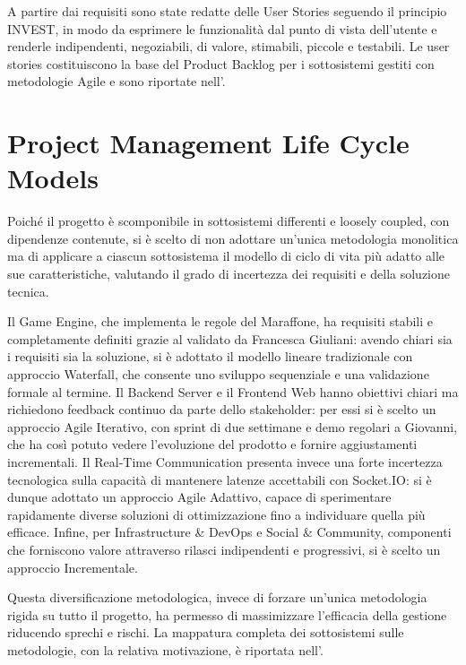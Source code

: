 A partire dai requisiti sono state redatte delle User Stories seguendo il principio INVEST, in modo da esprimere le funzionalità dal punto di vista dell'utente e renderle indipendenti, negoziabili, di valore, stimabili, piccole e testabili. Le user stories costituiscono la base del Product Backlog per i sottosistemi gestiti con metodologie Agile e sono riportate nell'.

\section{Project Management Life Cycle Models}

Poiché il progetto è scomponibile in sottosistemi differenti e loosely coupled, con dipendenze contenute, si è scelto di non adottare un'unica metodologia monolitica ma di applicare a ciascun sottosistema il modello di ciclo di vita più adatto alle sue caratteristiche, valutando il grado di incertezza dei requisiti e della soluzione tecnica.

Il Game Engine, che implementa le regole del Maraffone, ha requisiti stabili e completamente definiti grazie al  validato da Francesca Giuliani: avendo chiari sia i requisiti sia la soluzione, si è adottato il modello lineare tradizionale con approccio Waterfall, che consente uno sviluppo sequenziale e una validazione formale al termine. Il Backend Server e il Frontend Web hanno obiettivi chiari ma richiedono feedback continuo da parte dello stakeholder: per essi si è scelto un approccio Agile Iterativo, con sprint di due settimane e demo regolari a Giovanni, che ha così potuto vedere l'evoluzione del prodotto e fornire aggiustamenti incrementali. Il Real-Time Communication presenta invece una forte incertezza tecnologica sulla capacità di mantenere latenze accettabili con Socket.IO: si è dunque adottato un approccio Agile Adattivo, capace di sperimentare rapidamente diverse soluzioni di ottimizzazione fino a individuare quella più efficace. Infine, per Infrastructure \& DevOps e Social \& Community, componenti che forniscono valore attraverso rilasci indipendenti e progressivi, si è scelto un approccio Incrementale.

Questa diversificazione metodologica, invece di forzare un'unica metodologia rigida su tutto il progetto, ha permesso di massimizzare l'efficacia della gestione riducendo sprechi e rischi. La mappatura completa dei sottosistemi sulle metodologie, con la relativa motivazione, è riportata nell'.

